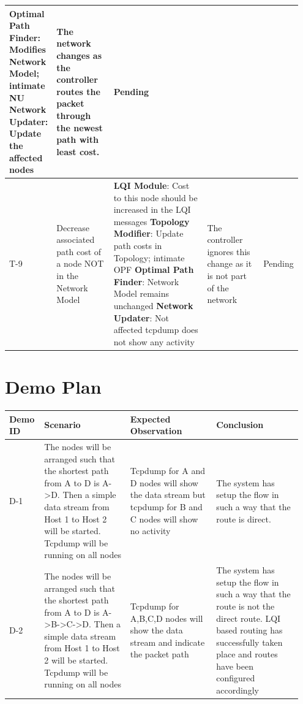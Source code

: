 \documentclass{article}
\begin{document}
{\begin{longtable}{  | p{0.1\linewidth} | p{0.2\linewidth} | p{0.35\linewidth} | p{0.2\linewidth} | p{0.1\linewidth} | }
\textbf{Optimal Path Finder}: Modifies Network Model; intimate NU\newline
\textbf{Network Updater}: Update the affected nodes \newline &
The network changes as the controller routes the packet through the newest path with least cost. &
Pending\\
\hline
T-9 & 
Decrease associated path cost of a node NOT in the Network Model & 
\textbf{LQI Module}: Cost to this node should be increased in the LQI messages\newline 
\textbf{Topology Modifier}: Update path costs in Topology; intimate OPF\newline 
\textbf{Optimal Path Finder}: Network Model remains unchanged\newline
\textbf{Network Updater}: Not affected\newline
tcpdump does not show any activity &
The controller ignores this change as it is not part of the network &
Pending\\
\hline
\end{longtable}}
\section{Demo Plan}
{\renewcommand{\arraystretch}{1.5}
\begin{tabular}{ | p{0.095\linewidth} | p{0.285\linewidth} | p{0.285\linewidth} | p{0.285\linewidth} | }
\hline
\textbf{Demo ID}	&	\textbf{Scenario}	&	\textbf{Expected Observation}	&	\textbf{Conclusion}	\\ 
\hline \hline
D-1 & The nodes will be arranged such that the shortest path from A to D is A-\textgreater D. Then a simple data stream from Host 1
to Host 2 will be started. Tcpdump will be running on all nodes & Tcpdump for A and D nodes will show the data stream
but tcpdump for B and C nodes will show no activity & The system has setup the flow in such a way that the route is
direct. \\
\hline
D-2 & The nodes will be arranged such that the shortest path from A to D is A-\textgreater B-\textgreater C-\textgreater D. Then a simple data stream from
Host 1 to Host 2 will be started. Tcpdump will be running on all nodes & Tcpdump for A,B,C,D nodes will show the data
stream and indicate the packet path & The system has setup the flow in such a way that the route is not the direct
route. LQI based routing has successfully taken place and routes have been configured accordingly \\
\hline
\end{tabular}}
\end{document}

